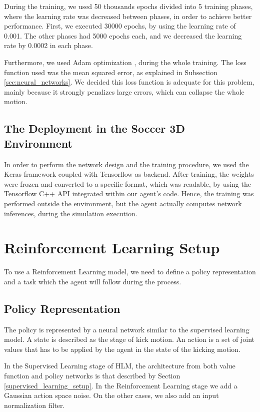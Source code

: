 During the training, we used 50 thousands epochs divided into 5 training phases, where the learning rate was decreased between phases, in order to achieve better performance. First, we executed 30000 epochs, by using the learning rate of 0.001. The other phases had 5000 epochs each, and we decreased the learning rate by 0.0002 in each phase.

Furthermore, we used Adam optimization \cite{adam2014}, during the whole training. The loss function used was the mean squared error, as explained in Subsection \ref{sec:neural_networks}. We decided this loss function is adequate for this problem, mainly because it strongly penalizes large errors, which can collapse the whole motion.

\subsection{The Deployment in the Soccer 3D Environment}
In order to perform the network design and the training procedure, we used the Keras \cite{chollet2015keras} framework coupled with Tensorflow \cite{tensorflow2015-whitepaper} as backend. After training, the weights were frozen and converted to a specific format, which was readable, by using the Tensorflow C++ API integrated within our agent's code. Hence, the training was performed outside the environment, but the agent actually computes network inferences, during the simulation execution.

\section{Reinforcement Learning Setup}

To use a Reinforcement Learning model, we need to define a policy representation and a task which the agent will follow during the process.

\subsection{Policy Representation}

The policy is represented by a neural network similar to the supervised learning model. A state is described as the stage of kick motion. An action is a set of joint values that has to be applied by the agent in the state of the kicking motion.

In the Supervised Learning stage of HLM, the architecture from both value function and policy networks is that described by Section \ref{supervised_learning_setup}. In the Reinforcement Learning stage we add a Gaussian action space noise. On the other cases, we also add an input normalization filter.


